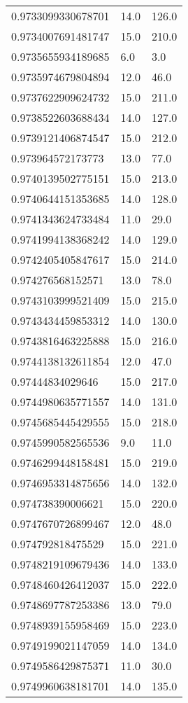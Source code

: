 \begin{center}
\begin{supertabular}[H]{p{0.30\textwidth}p{0.05\textwidth}p{0.05\textwidth}}
0.9733099330678701 & 14.0 & 126.0 \\ 
0.9734007691481747 & 15.0 & 210.0 \\ 
0.9735655934189685 & 6.0 & 3.0 \\ 
0.9735974679804894 & 12.0 & 46.0 \\ 
0.9737622909624732 & 15.0 & 211.0 \\ 
0.9738522603688434 & 14.0 & 127.0 \\ 
0.9739121406874547 & 15.0 & 212.0 \\ 
0.973964572173773 & 13.0 & 77.0 \\ 
0.9740139502775151 & 15.0 & 213.0 \\ 
0.9740644151353685 & 14.0 & 128.0 \\ 
0.9741343624733484 & 11.0 & 29.0 \\ 
0.9741994138368242 & 14.0 & 129.0 \\ 
0.9742405405847617 & 15.0 & 214.0 \\ 
0.974276568152571 & 13.0 & 78.0 \\ 
0.9743103999521409 & 15.0 & 215.0 \\ 
0.9743434459853312 & 14.0 & 130.0 \\ 
0.9743816463225888 & 15.0 & 216.0 \\ 
0.9744138132611854 & 12.0 & 47.0 \\ 
0.97444834029646 & 15.0 & 217.0 \\ 
0.9744980635771557 & 14.0 & 131.0 \\ 
0.9745685445429555 & 15.0 & 218.0 \\ 
0.9745990582565536 & 9.0 & 11.0 \\ 
0.9746299448158481 & 15.0 & 219.0 \\ 
0.9746953314875656 & 14.0 & 132.0 \\ 
0.974738390006621 & 15.0 & 220.0 \\ 
0.9747670726899467 & 12.0 & 48.0 \\ 
0.974792818475529 & 15.0 & 221.0 \\ 
0.9748219109679436 & 14.0 & 133.0 \\ 
0.9748460426412037 & 15.0 & 222.0 \\ 
0.9748697787253386 & 13.0 & 79.0 \\ 
0.9748939155958469 & 15.0 & 223.0 \\ 
0.9749199021147059 & 14.0 & 134.0 \\ 
0.9749586429875371 & 11.0 & 30.0 \\ 
0.9749960638181701 & 14.0 & 135.0 \\ 

\end{supertabular}
\end{center}
